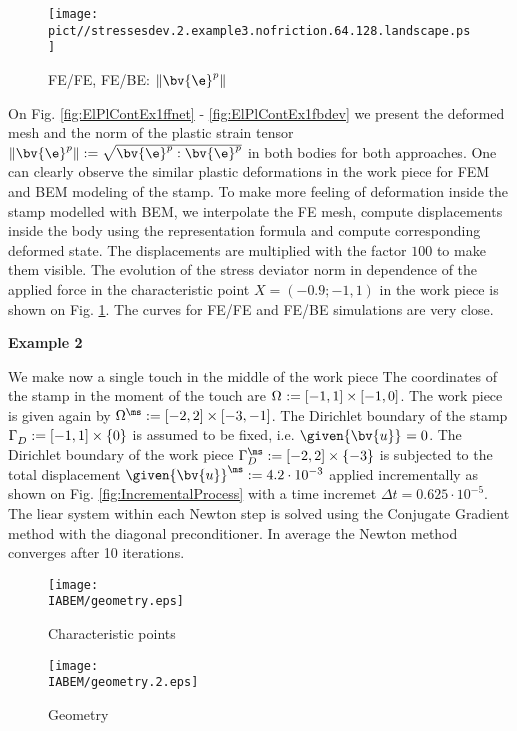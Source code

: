 \begin{figure} [h!]
\begin{center}
\texttt{[image: \\pict//stressesdev.2.example3.nofriction.64.128.landscape.ps]}
\caption{ \label{fig:ElPlContEx1devforce}  FE/FE, FE/BE: $\|\bv{\e}^p\|$ }
\end{center}
\end{figure}

On Fig. \ref{fig:ElPlContEx1ffnet} - \ref{fig:ElPlContEx1fbdev} we present the deformed mesh and the norm of the plastic strain tensor $\|\bv{\e}^p\|:= \sqrt{\bv{\e}^p : \bv{\e}^p}$ in both bodies for both approaches.
One can clearly observe the similar plastic deformations in the work piece for FEM and BEM modeling of the stamp. 
To make more feeling of deformation inside the stamp modelled with BEM, we interpolate the FE mesh, compute displacements inside the body using the representation formula and compute corresponding deformed state. The displacements are multiplied with the factor $100$ to make them visible.
The evolution of the stress deviator norm in dependence of the applied force in the characteristic point $X= (-0.9;-1,1)$ in the work piece is shown on Fig. \ref{fig:ElPlContEx1devforce}. The curves for FE/FE and FE/BE simulations are very close.

\textbf{Example 2}

We make now a single touch in the middle of the work piece 
The coordinates of the stamp in the moment of the touch are $\Omega^{\sl} := [-1,1] \times [-1, 0]$. The work piece is given again by $\Omega^{\ms} := [-2,2] \times [-3, -1]$. The Dirichlet boundary of the stamp $\Gamma_D^{\sl} := [-1,1] \times \{0\}$ is assumed to be fixed, i.e. $\given{\bv{u}}^{\sl}=0$. The Dirichlet boundary of the work piece $\Gamma_D^{\ms} := [-2,2] \times \{-3\}$ is subjected to the total displacement $\given{\bv{u}}^{\ms} := 4.2 \cdot 10^{-3}$ applied incrementally as shown on Fig. \ref{fig:IncrementalProcess} with a time incremet $\Delta t=0.625 \cdot 10^{-5}$. The liear system within each Newton step is solved using the Conjugate Gradient method with the diagonal preconditioner. In average the Newton method converges after 10 iterations.

\begin{figure}[h]
\begin{center}
\begin{minipage}[c]{6cm}
\texttt{[image: \\IABEM/geometry.eps]}
\caption{Characteristic points}\label{fig:Example2:CharacteristicPoints}
\end{minipage}
\begin{minipage}[c]{6cm}
\texttt{[image: \\IABEM/geometry.2.eps]}
\caption{Geometry}\label{fig:Example2:ProblemGeometry}
\end{minipage}
\end{center}
\end{figure}



